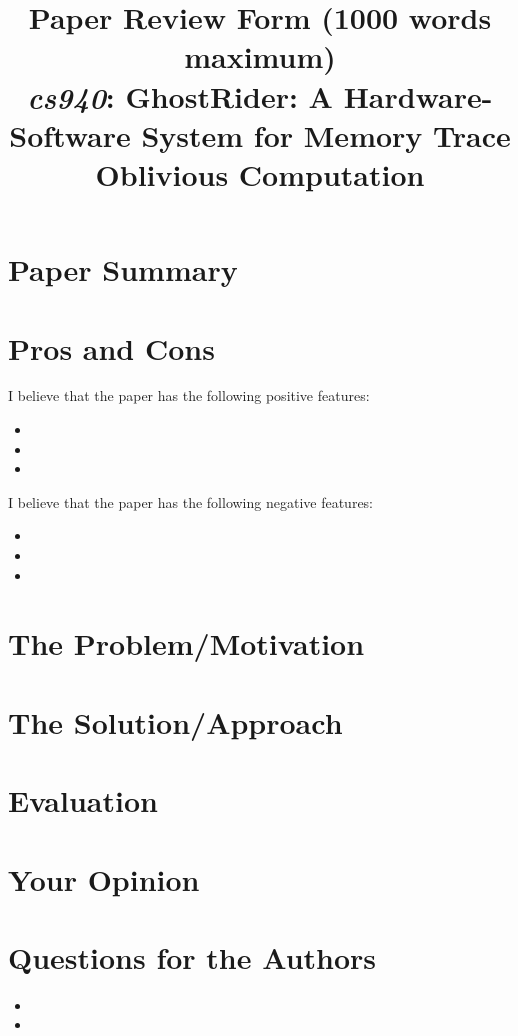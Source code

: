 \documentclass[11pt]{article}
\begin{document}
\title{Paper Review Form (1000 words maximum)\\
  \emph{cs940}: GhostRider: A Hardware-Software System for Memory Trace Oblivious Computation \cite{liu2015ghostrider}}
\maketitle

\section*{Paper Summary}

\section*{Pros and Cons}

I believe that the paper has the following positive features:
\begin{itemize}
	\item 
	\item 
	\item 
\end{itemize}

I believe that the paper has the following negative features:
\begin{itemize}
	\item 
	\item 
	\item 
\end{itemize}

\section*{The Problem/Motivation}


\section*{The Solution/Approach}


\section*{Evaluation}


\section*{Your Opinion}


\section*{Questions for the Authors}

\begin{itemize}
	\item
	\item 
\end{itemize}


\footnotesize{}
\end{document}
